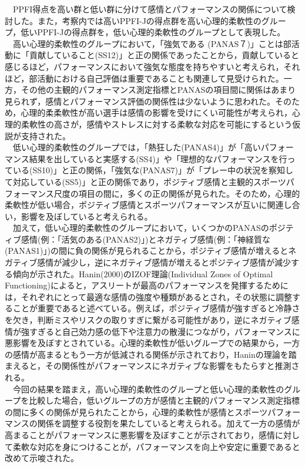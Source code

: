 \documentclass[12pt,a4paper,xelatex,ja=standard]{bxjsarticle}
\begin{document}
　PPFI得点を高い群と低い群に分けて感情とパフォーマンスの関係について検討した。また，考察内では高いPPFI-Jの得点群を高い心理的柔軟性のグループ，低いPPFI-Jの得点群を，低い心理的柔軟性のグループとして表現した。\\
　高い心理的柔軟性のグループにおいて，「強気である
(PANAS７)」ことは部活動に「貢献していること(SS12)」と正の関係であったことから，貢献していると感じるほど，パフォーマンスにおいて強気な態度を持ちやすいと考えられ，それほど，部活動における自己評価は重要であることも関連して見受けられた。一方，その他の主観的パフォーマンス測定指標とPANASの項目間に関係はあまり見られず，感情とパフォーマンス評価の関係性は少ないように思われた。そのため，心理的柔柔軟性が高い選手は感情の影響を受けにくい可能性が考えられ，心理的柔軟性の高さが，感情やストレスに対する柔軟な対応を可能にするという仮説が支持された。\\
　低い心理的柔軟性のグループでは，「熱狂した(PANAS4)」が「高いパフォーマンス結果を出していると実感する(SS4)」や「理想的なパフォーマンスを行っている(SS10)」と正の関係，「強気な(PANAS7)」が「プレー中の状況を察知して対応している(SS5)」と正の関係であり，ポジティブ感情と主観的スポーツパフォーマンス尺度の項目の間に，多くの正の関係が見られた。そのため，心理的柔軟性が低い場合，ポジティブ感情とスポーツパフォーマンスが互いに関連し合い，影響を及ぼしていると考えられる。\\
　加えて，低い心理的柔軟性のグループにおいて，いくつかのPANASのポジティブ感情(例：「活気のある(PANAS2)」)とネガティブ感情(例：「神経質な(PANAS1)」)の間に負の関係が見られることから，ポジティブ感情が増えるとネガティブ感情が減少し，逆にネガティブ感情が増えるとポジティブ感情が減少する傾向が示された。Hanin(2000)のIZOF理論(Individual
Zones of Optimal
Functioning)によると，アスリートが最高のパフォーマンスを発揮するためには，それぞれにとって最適な感情の強度や種類があるとされ，その状態に調整することが重要であると述べている。例えば，ポジティブ感情が強すぎると冷静さを欠き，判断ミスやリスクの取りすぎに繋がる可能性があり，逆にネガティブ感情が強すぎると自己効力感の低下や注意力の散漫につながり，パフォーマンスに悪影響を及ぼすとされている。心理的柔軟性が低いグループでの結果から，一方の感情が高まるともう一方が低減される関係が示されており，Haninの理論を踏まえると，その関係性がパフォーマンスにネガティブな影響をもたらすと推測される。\\
　今回の結果を踏まえ，高い心理的柔軟性のグループと低い心理的柔軟性のグループを比較した場合，低いグループの方が感情と主観的パフォーマンス測定指標の間に多くの関係が見られたことから，心理的柔軟性が感情とスポーツパフォーマンスの関係を調整する役割を果たしていると考えられる。加えて一方の感情が高まることがパフォーマンスに悪影響を及ぼすことが示されており，感情に対して柔軟な対応を身につけることが，パフォーマンスを向上や安定に重要であると改めて示唆された。
　
\end{document}
